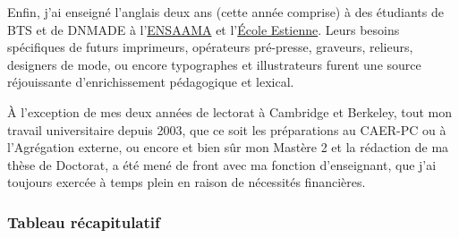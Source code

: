 \documentclass[
  10pt,
]{article}
\begin{document}
Enfin, j'ai enseigné l'anglais deux ans (cette année comprise) à des étudiants de BTS et de DNMADE à l'\href{http://www.ensaama.net/}{ENSAAMA} et l'\href{www.ecole-estienne.paris}{École Estienne}. Leurs besoins spécifiques de futurs imprimeurs, opérateurs pré-presse, graveurs, relieurs, designers de mode, ou encore typographes et illustrateurs furent une source réjouissante d'enrichissement pédagogique et lexical.

À l'exception de mes deux années de lectorat à Cambridge et Berkeley, tout mon travail universitaire depuis 2003, que ce soit les préparations au CAER-PC ou à l'Agrégation externe, ou encore
et bien sûr mon Mastère 2 et la rédaction de ma thèse de Doctorat, a été mené de front avec ma
fonction d'enseignant, que j'ai toujours exercée à temps plein en raison de nécessités financières.

\hypertarget{tableau-ruxe9capitulatif}{%
\subsubsection{Tableau récapitulatif}\label{tableau-ruxe9capitulatif}}
\end{document}
